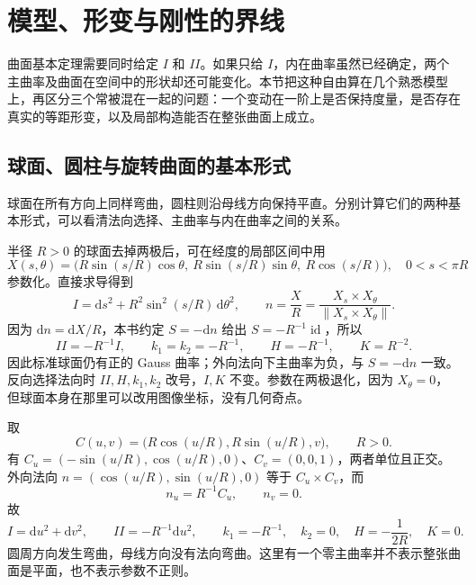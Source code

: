 
% 
% 
% 

\section{模型、形变与刚性的界线}
\label{g1:sec:0805}

曲面基本定理需要同时给定 \(I\) 和 \(II\)。如果只给 \(I\)，内在曲率虽然已经确定，两个主曲率及曲面在空间中的形状却还可能变化。本节把这种自由算在几个熟悉模型上，再区分三个常被混在一起的问题：一个变动在一阶上是否保持度量，是否存在真实的等距形变，以及局部构造能否在整张曲面上成立。

\subsection{球面、圆柱与旋转曲面的基本形式}
\label{g1:subsec:0805:01}

球面在所有方向上同样弯曲，圆柱则沿母线方向保持平直。分别计算它们的两种基本形式，可以看清法向选择、主曲率与内在曲率之间的关系。

\begin{example}\label{g1:exm:sphere-two-forms}
	半径 \(R>0\) 的球面去掉两极后，可在经度的局部区间中用
	\[
		X(s,\theta)=\bigl(R\sin(s/R)\cos\theta,\ R\sin(s/R)\sin\theta,\ R\cos(s/R)\bigr),
		\quad 0<s<\pi R
	\]
	参数化。直接求导得到
	\[
		I=\mathrm{d}s^2+R^2\sin^2(s/R)\,\mathrm{d}\theta^2,\qquad
		n=\frac{X}{R}=\frac{X_s\times X_\theta}{\|X_s\times X_\theta\|}.
	\]
	因为 \(\mathrm{d}n=\mathrm{d}X/R\)，本书约定 \(S=-\mathrm{d}n\) 给出 \(S=-R^{-1}\operatorname{id}\)，所以
	\[
		II=-R^{-1}I,\qquad k_1=k_2=-R^{-1},\qquad H=-R^{-1},\qquad K=R^{-2}.
	\]
	因此标准球面仍有正的 Gauss 曲率；外向法向下主曲率为负，与 \(S=-\mathrm{d}n\) 一致。反向选择法向时 \(II,H,k_1,k_2\) 改号，\(I,K\) 不变。参数在两极退化，因为 \(X_\theta=0\)，但球面本身在那里可以改用图像坐标，没有几何奇点。
\end{example}

\begin{example}\label{g1:exm:cylinder-two-forms}
	取
	\[
		C(u,v)=\bigl(R\cos(u/R),R\sin(u/R),v\bigr),\qquad R>0.
	\]
	有 \(C_u=(-\sin(u/R),\cos(u/R),0)\)、\(C_v=(0,0,1)\)，两者单位且正交。外向法向 \(n=(\cos(u/R),\sin(u/R),0)\) 等于 \(C_u\times C_v\)，而
	\[
		n_u=R^{-1}C_u,\qquad n_v=0.
	\]
	故
	\[
		I=\mathrm{d}u^2+\mathrm{d}v^2,\qquad II=-R^{-1}\mathrm{d}u^2,\qquad
		k_1=-R^{-1},\quad k_2=0,\quad H=-\frac1{2R},\quad K=0.
	\]
	圆周方向发生弯曲，母线方向没有法向弯曲。这里有一个零主曲率并不表示整张曲面是平面，也不表示参数不正则。
\end{example}

